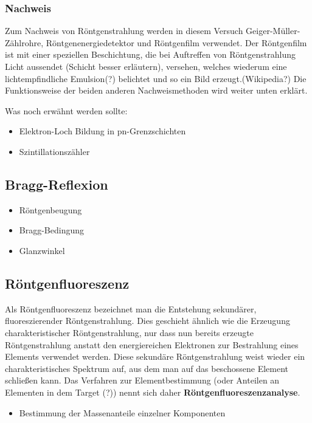 \documentclass[10pt, a4paper]{article}
\begin{document}
\subsubsection{Nachweis}
Zum Nachweis von Röntgenstrahlung werden in diesem Versuch Geiger-Müller-Zählrohre, Röntgenenergiedetektor und Röntgenfilm verwendet.
Der Röntgenfilm ist mit einer speziellen Beschichtung, die bei Auftreffen von Röntgenstrahlung Licht aussendet (Schicht besser erläutern), versehen, welches wiederum eine lichtempfindliche Emulsion(?) belichtet und so ein Bild erzeugt.(Wikipedia?)
Die Funktionsweise der beiden anderen Nachweismethoden wird weiter unten erklärt.

Was noch erwähnt werden sollte:
\begin{itemize}
  \item Elektron-Loch Bildung in pn-Grenzschichten
  \item Szintillationszähler
\end{itemize}

\subsection{Bragg-Reflexion}

\begin{itemize}
  \item Röntgenbeugung
  \item Bragg-Bedingung
  \item Glanzwinkel
\end{itemize}
 
\subsection{Röntgenfluoreszenz}
  Als Röntgenfluoreszenz bezeichnet man die Entstehung sekundärer, fluoreszierender Röntgenstrahlung.
  Dies geschieht ähnlich wie die Erzeugung charakteristischer Röntgenstrahlung, nur dass nun bereits erzeugte Röntgenstrahlung anstatt den energiereichen Elektronen zur Bestrahlung eines Elements verwendet werden.
  Diese sekundäre Röntgenstrahlung weist wieder ein charakteristisches Spektrum auf, aus dem man auf das beschossene Element schließen kann.
  Das Verfahren zur Elementbestimmung (oder Anteilen an Elementen in dem Target (?)) nennt sich daher \textbf{Röntgenfluoreszenzanalyse}.
  
\begin{itemize}
  \item Bestimmung der Massenanteile einzelner Komponenten
\end{itemize}
  
\end{document}
